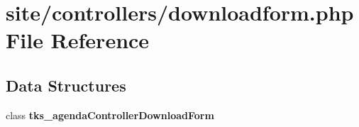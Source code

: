 \section{site/controllers/downloadform.php File Reference}
\label{controllers_2downloadform_8php}
\subsection*{Data Structures}
\begin{DoxyCompactItemize}
\item 
class \textbf{ tks\+\_\+agenda\+Controller\+Download\+Form}
\end{DoxyCompactItemize}
